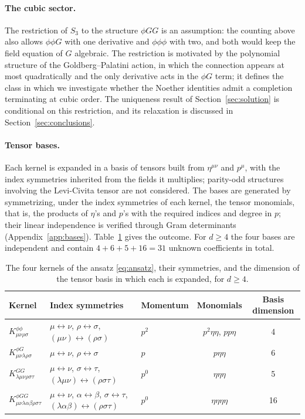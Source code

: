 \documentclass[prd,aps,preprint,superscriptaddress,nofootinbib,amsmath,amssymb,eqsecnum]{revtex4-2}
\begin{document}
\paragraph{The cubic sector.} The restriction of $S_3$ to the structure $\phi GG$ is an
assumption: the counting above also allows $\phi\phi G$ with one derivative and
$\phi\phi\phi$ with two, and both would keep the field equation of $G$ algebraic. The
restriction is motivated by the polynomial structure of the Goldberg--Palatini action, in
which the connection appears at most quadratically and the only derivative acts in the
$\phi G$ term; it defines the class in which we investigate whether the Noether identities
admit a completion terminating at cubic order. The uniqueness result of
Section~\ref{sec:solution} is conditional on this restriction, and its relaxation is
discussed in Section~\ref{sec:conclusions}.

\paragraph{Tensor bases.} Each kernel is expanded in a basis of tensors built from
$\eta^{\mu\nu}$ and $p^\mu$, with the index symmetries inherited from the fields it
multiplies; parity-odd structures involving the Levi-Civita tensor are not considered. The bases are generated by symmetrizing, under the index symmetries of each
kernel, the tensor monomials, that is, the products of $\eta$'s and $p$'s with the required
indices and degree in $p$; their linear independence is verified through Gram determinants
(Appendix~\ref{app:bases}). Table~\ref{tab:kernels} gives the outcome. For $d\geq4$ the
four bases are independent and contain $4+6+5+16=31$ unknown coefficients in total.

\begin{table}[htb]
\centering
\begin{tabular}{@{}lllcc@{}}
\toprule
Kernel & Index symmetries & Momentum & Monomials & Basis dimension \\
\midrule
$K^{\phi\phi}_{\mu\nu\rho\sigma}$ & $\mu\leftrightarrow\nu$, $\rho\leftrightarrow\sigma$, $(\mu\nu)\leftrightarrow(\rho\sigma)$ & $p^2$ & $p^2\eta\eta$, $pp\eta$ & 4 \\
$K^{\phi G}_{\mu\nu\lambda\rho\sigma}$ & $\mu\leftrightarrow\nu$, $\rho\leftrightarrow\sigma$ & $p$ & $p\eta\eta$ & 6 \\
$K^{GG}_{\lambda\mu\nu\rho\sigma\tau}$ & $\mu\leftrightarrow\nu$, $\sigma\leftrightarrow\tau$, $(\lambda\mu\nu)\leftrightarrow(\rho\sigma\tau)$ & $p^0$ & $\eta\eta\eta$ & 5 \\
$K^{\phi GG}_{\mu\nu\lambda\alpha\beta\rho\sigma\tau}$ & $\mu\leftrightarrow\nu$, $\alpha\leftrightarrow\beta$, $\sigma\leftrightarrow\tau$, $(\lambda\alpha\beta)\leftrightarrow(\rho\sigma\tau)$ & $p^0$ & $\eta\eta\eta\eta$ & 16 \\
\bottomrule
\end{tabular}
\caption{The four kernels of the ansatz \eqref{eq:ansatz}, their symmetries, and the
dimension of the tensor basis in which each is expanded, for $d\geq4$.}
\label{tab:kernels}
\end{table}
\end{document}
